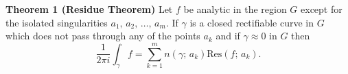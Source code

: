 \documentclass{article}
\begin{document}
	\textbf{Theorem 1 (Residue Theorem)}
	Let $f$ be analytic in the region $G$ except for the isolated
	singularities $a_1,\,a_2,\,\ldots,\,a_m$. If $\gamma$ is a closed
	rectifiable curve in $G$ which does not pass through any of the
	points $a_k$ and if $\gamma\approx 0$ in $G$ then
	\begin{equation*}
	\frac{1}{2\pi i}\int_\gamma f
	=\sum_{k=1}^m n(\gamma;\,a_k) \text{Res}(f;\,a_k).
	\end{equation*}
\end{document}
